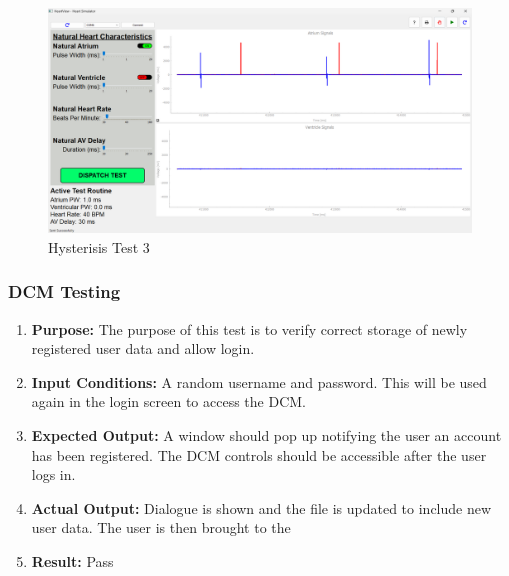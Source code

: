 \documentclass{article}
\newcounter{subsubsubsection}[subsubsection]
\begin{document}
\begin{tcolorbox}
    \begin{figure}[H]\label{Hystest3}
        \includegraphics[width=\textwidth]{hytheresistest3.png}
        \caption{Hysterisis Test 3}
    \end{figure}
\end{tcolorbox}

\newpage
\subsubsection{DCM Testing}


\begin{enumerate}[label=]
   \item \textbf{Purpose:} The purpose of this test is to verify correct storage of newly registered user data 
   and allow login. 
   \item \textbf{Input Conditions:} A random username and password. This will be used again in the login screen to access the DCM. 
   \item \textbf{Expected Output:} A window should pop up notifying the user an account has been registered. The 
   DCM controls should be accessible after the user logs in. 
   \item \textbf{Actual Output:} Dialogue is shown and the file is updated to include new user data. The user is then brought to the 
   \item \textbf{Result:} Pass
\end{enumerate}
\end{document}
